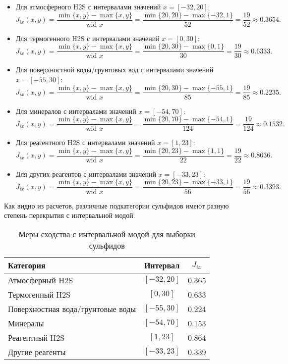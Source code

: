 \documentclass[a4paper,12pt]{article}
\begin{document}
    \begin{itemize}
    \item Для атмосферного H2S с интервалами значений \( x = [-32, 20] \):
    \[
    J_{ix}(x, y) = \frac{\min\{x,y\} - \max\{x,y\}}{\text{wid } x} = \frac{\min\{20, 20\} - \max\{-32, 1\}}{52} = \frac{19}{52} \approx 0.3654.
    \]

    \item Для термогенного H2S с интервалами значений \( x = [0, 30] \):
    \[
    J_{ix}(x, y) = \frac{\min\{x,y\} - \max\{x,y\}}{\text{wid } x} = \frac{\min\{20, 30\} - \max\{0, 1\}}{30} = \frac{19}{30} \approx 0.6333.
    \]

    \item Для поверхностной воды/грунтовых вод с интервалами значений \( x = [-55, 30] \):
    \[
    J_{ix}(x, y) = \frac{\min\{x,y\} - \max\{x,y\}}{\text{wid } x} = \frac{\min\{20, 30\} - \max\{-55, 1\}}{85} = \frac{19}{85} \approx 0.2235.
    \]

    \item Для минералов с интервалами значений \( x = [-54, 70] \):
    \[
    J_{ix}(x, y) = \frac{\min\{x,y\} - \max\{x,y\}}{\text{wid } x} = \frac{\min\{20, 70\} - \max\{-54, 1\}}{124} = \frac{19}{124} \approx 0.1532.
    \]

    \item Для реагентного H2S с интервалами значений \( x = [1, 23] \):
    \[
    J_{ix}(x, y) = \frac{\min\{x,y\} - \max\{x,y\}}{\text{wid } x} = \frac{\min\{20, 23\} - \max\{1, 1\}}{22} = \frac{19}{22} \approx 0.8636.
    \]

    \item Для других реагентов с интервалами значений \( x = [-33, 23] \):
    \[
    J_{ix}(x, y) = \frac{\min\{x,y\} - \max\{x,y\}}{\text{wid } x} = \frac{\min\{20, 23\} - \max\{-33, 1\}}{56} = \frac{19}{56} \approx 0.3393.
    \]
    \end{itemize}

    Как видно из расчетов, различные подкатегории сульфидов имеют разную степень перекрытия с интервальной модой.

    \begin{table}[h]
    \centering
    \caption{Меры сходства с интервальной модой для выборки сульфидов}
    \label{tab:sulfide_similarity}
    \begin{tabular}{|l|c|c|}
    \hline
    Категория & Интервал & \( J_{ix} \) \\
    \hline
    Атмосферный H2S & \([-32, 20]\) & 0.365 \\
    \hline
    Термогенный H2S & \([0, 30]\) & 0.633 \\
    \hline
    Поверхностная вода/грунтовые воды & \([-55, 30]\) & 0.224 \\
    \hline
    Минералы & \([-54, 70]\) & 0.153 \\
    \hline
    Реагентный H2S & \([1, 23]\) & 0.864 \\
    \hline
    Другие реагенты & \([-33, 23]\) & 0.339 \\
    \hline
    \end{tabular}
    \end{table}
    \newpage
\end{document}
